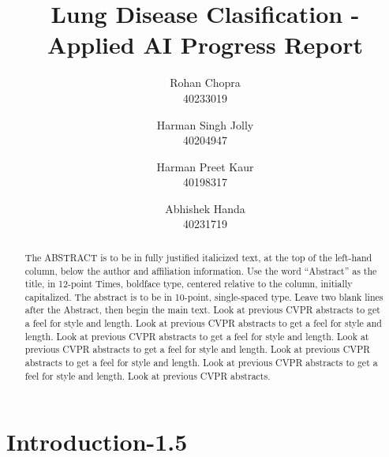 \documentclass[10pt,twocolumn,letterpaper]{article}
\def\subName{Applied AI }
\begin{document}
\def\cvprPaperID{Group-Q} %
\def\confName{COMP6721}
\def\confYear{2022}

\title{Lung Disease Clasification - \subName Progress Report}
\author{Rohan Chopra\\
\small 40233019\\
\and
Harman Singh Jolly\\
\small 40204947\\
\and
Harman Preet Kaur\\
\small 40198317\\
\and
Abhishek Handa\\
\small 40231719\\
}
\maketitle

\begin{abstract}
  The ABSTRACT is to be in fully justified italicized text, at the top of the left-hand column, 
  below the author and affiliation information.
  Use the word ``Abstract'' as the title, in 12-point Times, boldface type, centered relative 
  to the column, initially capitalized.
  The abstract is to be in 10-point, single-spaced type.
  Leave two blank lines after the Abstract, then begin the main text.
  Look at previous CVPR abstracts to get a feel for style and length.
  Look at previous CVPR abstracts to get a feel for style and length.
  Look at previous CVPR abstracts to get a feel for style and length.
  Look at previous CVPR abstracts to get a feel for style and length.
  Look at previous CVPR abstracts to get a feel for style and length.
  Look at previous CVPR abstracts to get a feel for style and length.
  Look at previous CVPR abstracts.
\end{abstract}

\section{Introduction-1.5}
\label{sec:intro}
\end{document}
